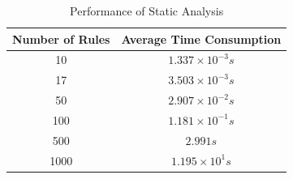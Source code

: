 %	

\begin{table}[htbp]
	\caption{Performance of Static Analysis}
	\label{performance_static_analysis}
	\centering
	\begin{tabular}[width=1\textwidth]{c|c}
		\hline
		Number of Rules & Average Time Consumption\\
		\hline
		10 & $1.337 \times 10^{-3}$\(s\) \\
		\hline
		17 & $3.503 \times 10^{-3}$\(s\) \\
		\hline
		50 & $2.907 \times 10^{-2}$\(s\) \\
		\hline
		100 & $1.181 \times 10^{-1}$\(s\) \\
		\hline
		500 & $2.991$\(s\) \\
		\hline
		1000 & $1.195 \times 10^{1}$\(s\) \\
		\hline
	\end{tabular}
	
\end{table}

